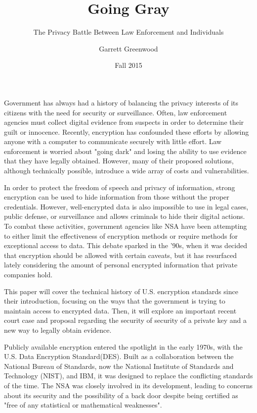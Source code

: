 \documentclass[12pt]{turabian-researchpaper}
\title{Going Gray}
\subtitle{The Privacy Battle Between Law Enforcement and Individuals}
\author{Garrett Greenwood}
\date{Fall 2015}
\begin{document}
\maketitle

Government has always had a history of balancing the privacy interests of its citizens with the need for security or surveillance.
Often, law enforcement agencies must collect digital evidence from suspects in order to determine their guilt or innocence.
Recently, encryption has confounded these efforts by allowing anyone with a computer to communicate securely with little effort.
Law enforcement is worried about "going dark" and losing the ability to use evidence that they have legally obtained.
However, many of their proposed solutions, although technically possible, introduce a wide array of costs and vulnerabilities.

In order to protect the freedom of speech and privacy of information, strong encryption can be used to hide information from those without the proper credentials.
However, well-encrypted data is also impossible to use in legal cases, public defense, or surveillance and allows criminals to hide their digital actions.
To combat these activities, government agencies like NSA have been attempting to either limit the effectiveness of encryption methods or require methods for exceptional access to data.
This debate sparked in the '90s, when it was decided that encryption should be allowed with certain caveats, but it has resurfaced lately considering the amount of personal encrypted information that private companies hold.

This paper will cover the technical history of U.S. encryption standards since their introduction, focusing on the ways that the government is trying to maintain access to encrypted data.
Then, it will explore an important recent court case and proposal regarding the security of security of a private key and a new way to legally obtain evidence.

Publicly available encryption entered the spotlight in the early 1970s, with the U.S. Data Encryption Standard(DES).
Built as a collaboration between the National Bureau of Standards, now the National Institute of Standards and Technology (NIST), and IBM, it was designed to replace the conflicting standards of the time.
The NSA was closely involved in its development, leading to concerns about its security and the possibility of a back door despite being certified as "free of any statistical or mathematical weaknesses".
\end{document}
